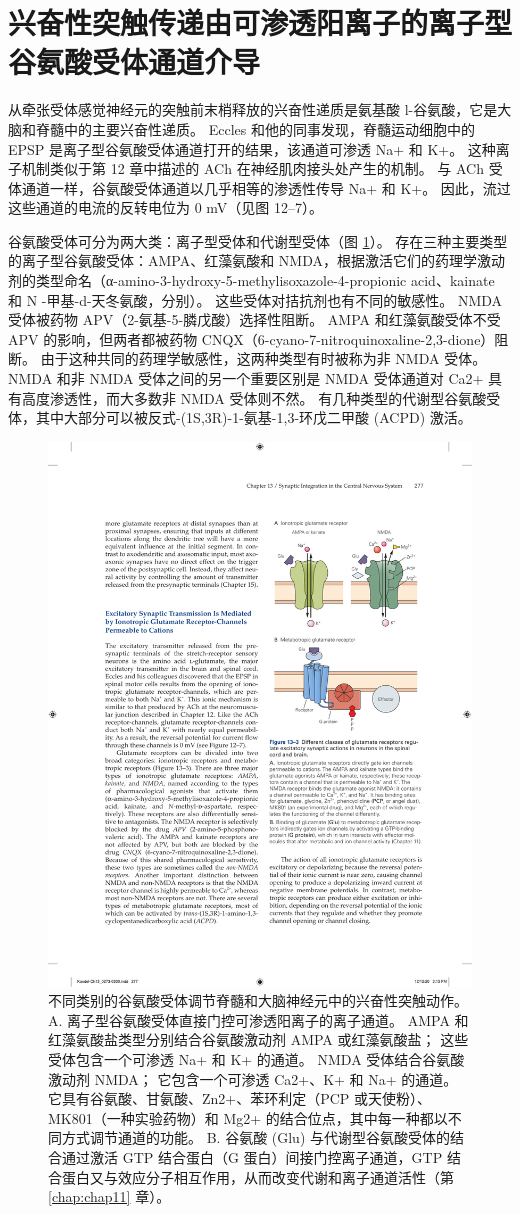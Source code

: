 \section{兴奋性突触传递由可渗透阳离子的离子型谷氨酸受体通道介导}

从牵张受体感觉神经元的突触前末梢释放的兴奋性递质是氨基酸 l-谷氨酸，它是大脑和脊髓中的主要兴奋性递质。 
Eccles 和他的同事发现，脊髓运动细胞中的 EPSP 是离子型谷氨酸受体通道打开的结果，该通道可渗透 Na+ 和 K+。 
这种离子机制类似于第 12 章中描述的 ACh 在神经肌肉接头处产生的机制。
与 ACh 受体通道一样，谷氨酸受体通道以几乎相等的渗透性传导 Na+ 和 K+。 因此，流过这些通道的电流的反转电位为 0 mV（见图 12–7）。


谷氨酸受体可分为两大类：离子型受体和代谢型受体（图 \ref{fig:13_3}）。 
存在三种主要类型的离子型谷氨酸受体：AMPA、红藻氨酸和 NMDA，根据激活它们的药理学激动剂的类型命名（α-amino-3-hydroxy-5-methylisoxazole-4-propionic acid、kainate 和 N -甲基-d-天冬氨酸，分别）。
这些受体对拮抗剂也有不同的敏感性。 NMDA 受体被药物 APV（2-氨基-5-膦戊酸）选择性阻断。 
AMPA 和红藻氨酸受体不受 APV 的影响，但两者都被药物 CNQX（6-cyano-7-nitroquinoxaline-2,3-dione）阻断。 
由于这种共同的药理学敏感性，这两种类型有时被称为非 NMDA 受体。 
NMDA 和非 NMDA 受体之间的另一个重要区别是 NMDA 受体通道对 Ca2+ 具有高度渗透性，而大多数非 NMDA 受体则不然。 
有几种类型的代谢型谷氨酸受体，其中大部分可以被反式-(1S,3R)-1-氨基-1,3-环戊二甲酸 (ACPD) 激活。

\begin{figure}[htbp]
	\centering
	\includegraphics[width=0.5\linewidth]{chap13/fig_13_3}
	\caption{不同类别的谷氨酸受体调节脊髓和大脑神经元中的兴奋性突触动作。 A. 离子型谷氨酸受体直接门控可渗透阳离子的离子通道。 AMPA 和红藻氨酸盐类型分别结合谷氨酸激动剂 AMPA 或红藻氨酸盐； 这些受体包含一个可渗透 Na+ 和 K+ 的通道。 NMDA 受体结合谷氨酸激动剂 NMDA； 它包含一个可渗透 Ca2+、K+ 和 Na+ 的通道。 它具有谷氨酸、甘氨酸、Zn2+、苯环利定（PCP 或天使粉）、MK801（一种实验药物）和 Mg2+ 的结合位点，其中每一种都以不同方式调节通道的功能。 B. 谷氨酸 (Glu) 与代谢型谷氨酸受体的结合通过激活 GTP 结合蛋白（G 蛋白）间接门控离子通道，GTP 结合蛋白又与效应分子相互作用，从而改变代谢和离子通道活性（第 \ref{chap:chap11} 章）。}
	\label{fig:13_3}
\end{figure}


